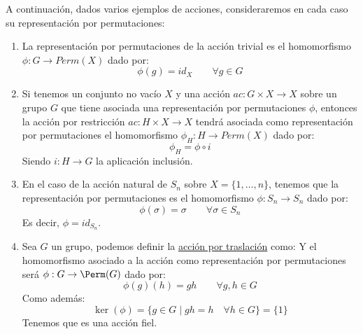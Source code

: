 \begin{ejemplo}
    A continuación, dados varios ejemplos de acciones, consideraremos en cada caso su representación por permutaciones:
    \begin{enumerate}
        \item La representación por permutaciones de la acción trivial es el homomorfismo $\phi:G\to Perm(X)$ dado por:
            \begin{equation*}
                \phi(g) = id_X \qquad \forall g\in G
            \end{equation*}
        \item Si tenemos un conjunto no vacío $X$ y una acción $ac:G\times X\to X$ sobre un grupo $G$ que tiene asociada una representación por permutaciones $\phi$, entonces la acción por restricción $ac:H\times X\to X$ tendrá asociada como representación por permutaciones el homomorfismo $\phi_H:H\to Perm(X)$ dado por:
            \begin{equation*}
                \phi_H = \phi \circ i 
            \end{equation*}
            Siendo $i:H\to G$ la aplicación inclusión.
        \item En el caso de la acción natural de $S_n$ sobre $X =\{1,\ldots,n\} $, tenemos que la representación por permutaciones es el homomorfismo $\phi:S_n\to S_n$ dado por:
            \begin{equation*}
                \phi(\sigma) = \sigma \qquad \forall \sigma\in S_n
            \end{equation*}
            Es decir, $\phi = id_{S_n}$.
        \item Sea $G$ un grupo, podemos definir la \underline{acción por traslación} como:
            Y el homomorfismo asociado a la acción como representación por permutaciones será $\phi:G\to \Perm(G)$ dado por:
            \begin{equation*}
                \phi(g)(h) = gh \qquad \forall g,h\in G
            \end{equation*}
            Como además:
            \begin{equation*}
                \ker(\phi) = \{g\in G\mid gh = h \quad \forall h\in G\} = \{1\}
            \end{equation*}
            Tenemos que es una acción fiel.
    \end{enumerate}
\end{ejemplo}

